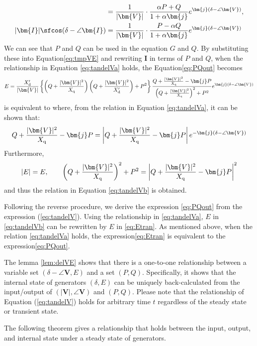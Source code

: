 \documentclass[tombow,dvipdfmx]{corona-a5-1.1}
\begin{document}
\begin{証明}
\begin{align*}
& =
\frac{1}{|\bm{V}|} \cdot
\frac{\alpha P +Q}{ 1+\alpha \bm{j} }e^{\bm{j}(\delta - \angle \bm{V})}, \\
|\bm{I}| \sfcos (\delta - \angle \bm{I})
& =
\frac{1}{|\bm{V}|} \cdot
\frac{ P - \alpha Q}{ 1+\alpha \bm{j} }e^{\bm{j}(\delta - \angle \bm{V})}
\end{align*}
We can see that $P$ and $Q$ can be used in the equation $G$ and $Q$.
By substituting these into Equation\ref{eq:tmpVE} and rewriting $\bm{I}$ in terms of $P$ and $Q$, when the relationship in Equation \ref{eq:tandelVa} holds, the Equation\ref{eq:PQout} becomes
\begin{align}\label{eq:Etran}
E=
\frac{X_{\rm d}'}{|\bm{V}| } 
\left\{
\left(Q + \frac{|\bm{V}|^2}{X_{\rm q}} \right) \left(Q + \frac{|\bm{V}|^2}{X_{\rm d}'} \right) +P^2
\right\}
\frac{  Q + \tfrac{|\bm{V}|^2}{X_{\rm q}} - \bm{j} P }
{   \left( Q + \tfrac{|\bm{V}|^2}{X_{\rm q}} \right)^2 + P^2   }
e^{\bm{j}(\delta - \angle \bm{V})}
\end{align}
is equivalent to
where, from the relation in Equation \ref{eq:tandelVa}, it can be shown that:
\begin{align*}
Q + \frac{|\bm{V}|^2}{X_{\rm q}} - \bm{j} P
= 
\left|Q + \frac{|\bm{V}|^2}{X_{\rm q}} - \bm{j} P \right|
e^{-\bm{j}(\delta - \angle \bm{V})}
\end{align*}
Furthermore,
\[
|E|=E
,\qquad
\left( Q + \frac{|\bm{V}|^2}{X_{\rm q}} \right)^2 + P^2
=
\left|Q + \frac{|\bm{V}|^2}{X_{\rm q}} - \bm{j} P \right|^2
\]
and thus the relation in Equation \ref{eq:tandelVb} is obtained.

Following the reverse procedure, we derive the expression \ref{eq:PQout} from the expression (\ref{eq:tandelV}).
Using the relationship in \ref{eq:tandelVa}, $E$ in \ref{eq:tandelVb} can be rewritten by $E$ in \ref{eq:Etran}.
As mentioned above, when the relation \ref{eq:tandelVa} holds, the expression\ref{eq:Etran} is equivalent to the expression\ref{eq:PQout}.
\end{証明}

The lemma \ref{lem:delVE} shows that there is a one-to-one relationship between a variable set $(\delta - \angle \bm{V},E)$ and a set $(P,Q)$. 
Specifically, it shows that the internal state of generators $(\delta,E)$ can be uniquely back-calculated from the input/output of $(|\bm{V}|,\angle \bm{V})$ and $(P,Q)$. 
Please note that the relationship of Equation (\ref{eq:tandelV}) holds for arbitrary time $t$ regardless of the steady state or transient state.

The following theorem gives a relationship that holds between the input, output, and internal state under a steady state of generators.
\end{document}
